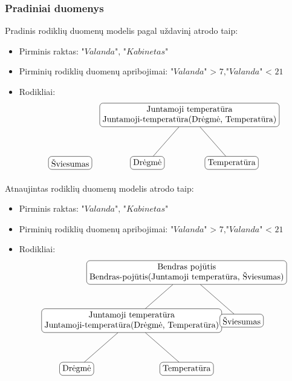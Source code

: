 \documentclass{VUMIFPSbakalaurinis}
\begin{document}
\subsubsection{Pradiniai duomenys}
\noindent Pradinis rodiklių duomenų modelis pagal uždavinį atrodo taip:
\begin{itemize}
    \item Pirminis raktas: \(\textit{"Valanda", "Kabinetas"}\)
    \item Pirminių rodiklių duomenų apribojimai: \(\textit{"Valanda" > 7},\textit{"Valanda" < 21}\) 
    \item Rodikliai:
    \[
        \begin{tikzpicture}[sibling distance=10em,
            level distance=2cm,
            every node/.style = {shape=rectangle, rounded corners,	
                                draw, align=center,	
                                top color=white, bottom color=white}]	
            \node{Šviesumas}; 	
        \end{tikzpicture}\>\>\>\>
        \begin{tikzpicture}[sibling distance=10em,
            level distance=2cm,
            every node/.style = {shape=rectangle, rounded corners,	
                                draw, align=center,	
                                top color=white, bottom color=white}]	
            \node{Juntamoji temperatūra\\Juntamoji-temperatūra(Drėgmė, Temperatūra)}
                    child { node {Drėgmė} }	
                    child { node {Temperatūra} } ; 	
        \end{tikzpicture} 	
    \]
\end{itemize}
Atnaujintas rodiklių duomenų modelis atrodo taip:
\begin{itemize}
    \item Pirminis raktas: \(\textit{"Valanda", "Kabinetas"}\)
    \item Pirminių rodiklių duomenų apribojimai: \(\textit{"Valanda" > 7},\textit{"Valanda" < 21}\) 
    \item Rodikliai:
    \[	
        \begin{tikzpicture}[sibling distance=13em,
            level distance=2cm,
            every node/.style = {shape=rectangle, rounded corners,	
                                draw, align=center,	
                                top color=white, bottom color=white}]	
            \node{ Bendras pojūtis \\Bendras-pojūtis(Juntamoji temperatūra, Šviesumas)}
                child{ node {Juntamoji temperatūra\\Juntamoji-temperatūra(Drėgmė, Temperatūra)}
                        child { node {Drėgmė} }	
                        child { node {Temperatūra} } }
                child {node {Šviesumas}}; 	
        \end{tikzpicture} 	
    \]
\end{itemize}
\end{document}
